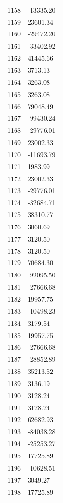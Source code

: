 \documentclass[a4paper,11pt]{article}
\begin{document}
\begin{center}
\begin{longtable}{|R{1.5cm}|R{2.5cm}|}
 1158 &    -13335.20 \\
 1159 &     23601.34 \\
 1160 &    -29472.20 \\
 1161 &    -33402.92 \\
 1162 &     41445.66 \\
 1163 &      3713.13 \\
 1164 &      3263.08 \\
 1165 &      3263.08 \\
 1166 &     79048.49 \\
 1167 &    -99430.24 \\
 1168 &    -29776.01 \\
 1169 &     23002.33 \\
 1170 &    -11693.79 \\
 1171 &      1983.99 \\
 1172 &     23002.33 \\
 1173 &    -29776.01 \\
 1174 &    -32684.71 \\
 1175 &     38310.77 \\
 1176 &      3060.69 \\
 1177 &      3120.50 \\
 1178 &      3120.50 \\
 1179 &     70684.30 \\
 1180 &    -92095.50 \\
 1181 &    -27666.68 \\
 1182 &     19957.75 \\
 1183 &    -10498.23 \\
 1184 &      3179.54 \\
 1185 &     19957.75 \\
 1186 &    -27666.68 \\
 1187 &    -28852.89 \\
 1188 &     35213.52 \\
 1189 &      3136.19 \\
 1190 &      3128.24 \\
 1191 &      3128.24 \\
 1192 &     62682.93 \\
 1193 &    -84038.28 \\
 1194 &    -25253.27 \\
 1195 &     17725.89 \\
 1196 &    -10628.51 \\
 1197 &      3049.27 \\
 1198 &     17725.89 \\

\end{longtable}
\end{center}
\end{document}
